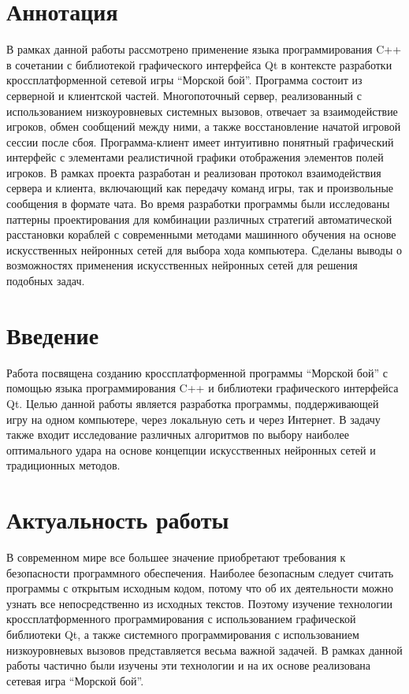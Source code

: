 \documentclass[12pt, a4paper, oneside]{article}
\begin{document}

\onehalfspacing
\section*{Аннотация}

В рамках данной работы рассмотрено применение языка программирования C++ в сочетании с библиотекой графического интерфейса Qt в контексте разработки кроссплатформенной сетевой игры ``Морской бой''.  Программа состоит из серверной и клиентской частей.  Многопоточный сервер,  реализованный с использованием низкоуровневых системных вызовов, отвечает за взаимодействие игроков, обмен сообщений между ними,  а также восстановление начатой игровой сессии после сбоя. Программа-клиент имеет интуитивно понятный графический интерфейс с элементами реалистичной графики отображения элементов полей игроков. В рамках проекта разработан и реализован протокол взаимодействия сервера и клиента, включающий как передачу команд игры, так и произвольные сообщения в формате чата.  Во время разработки программы были исследованы паттерны проектирования для комбинации различных стратегий автоматической расстановки кораблей с современными методами машинного обучения на основе искусственных нейронных сетей для выбора хода компьютера. Сделаны выводы о возможностях применения искусственных нейронных сетей для решения подобных задач.

\newpage
\tableofcontents
\newpage
\section*{Введение}

Работа посвящена созданию кроссплатформенной программы ``Морской бой''  с помощью языка программирования C++ и библиотеки графического интерфейса Qt. Целью данной работы является разработка программы, поддерживающей игру на одном компьютере, через локальную сеть и через Интернет. В задачу также входит исследование различных алгоритмов по выбору наиболее оптимального удара на основе концепции искусственных нейронных сетей и традиционных методов.

\section*{Актуальность работы}

В современном мире все большее значение приобретают требования к безопасности программного обеспечения. Наиболее безопасным следует считать программы с открытым исходным кодом, потому что об их деятельности можно узнать все непосредственно из исходных текстов. Поэтому изучение технологии кроссплатформенного программирования с использованием графической библиотеки Qt, а также системного программирования с использованием низкоуровневых вызовов представляется весьма важной задачей. В рамках данной работы частично были изучены эти технологии и на их основе реализована сетевая игра ``Морской бой''. 
\end{document}
